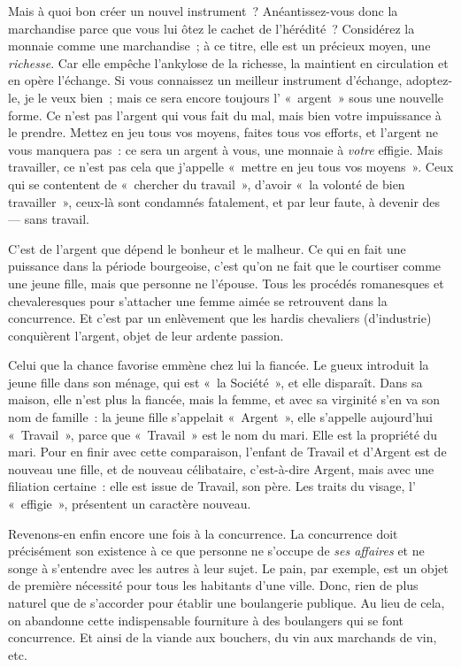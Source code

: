 \documentclass[french,twoside]{book} %
\begin{document}
Mais à quoi bon créer un nouvel instrument ? Anéantissez-vous donc la marchandise parce que vous  lui ôtez le cachet de l’hérédité ? Considérez la monnaie comme une marchandise ; à ce titre, elle est un précieux moyen, une \emph{richesse}. Car elle empêche l’ankylose de la richesse, la maintient en circulation et en opère l’échange. Si vous connaissez un meilleur instrument d’échange, adoptez-le, je le veux bien ; mais ce sera encore toujours l’ « argent » sous une nouvelle forme. Ce n’est pas l’argent qui vous fait du mal, mais bien votre impuissance à le prendre. Mettez en jeu tous vos moyens, faites tous vos efforts, et l’argent ne vous manquera pas : ce sera un argent à vous, une monnaie à \emph{votre} effigie. Mais travailler, ce n’est pas cela que j’appelle « mettre en jeu tous vos moyens ». Ceux qui se contentent de « chercher du travail », d’avoir « la volonté de bien travailler », ceux-là sont condamnés fatalement, et par leur faute, à devenir des — sans travail.\par
C’est de l’argent que dépend le bonheur et le malheur. Ce qui en fait une puissance dans la période bourgeoise, c’est qu’on ne fait que le courtiser comme une jeune fille, mais que personne ne l’épouse. Tous les procédés romanesques et chevaleresques pour s’attacher une femme aimée se retrouvent dans la concurrence. Et c’est par un enlèvement que les hardis chevaliers (d’industrie) conquièrent l’argent, objet de leur ardente passion.\par
Celui que la chance favorise emmène chez lui la fiancée. Le gueux introduit la jeune fille dans son ménage, qui est « la Société », et elle disparaît. Dans sa maison, elle n’est plus la fiancée, mais la femme, et avec sa virginité s’en va son nom de famille : la jeune fille s’appelait « Argent », elle s’appelle aujourd’hui « Travail », parce que « Travail » est le nom du mari. Elle est la propriété du mari. Pour en finir avec cette comparaison, l’enfant de Travail et d’Argent est de nouveau une fille, et de nouveau célibataire, c’est-à-dire Argent, mais avec une filiation certaine : elle est issue de Travail, son père. Les  traits du visage, l’ « effigie », présentent un caractère nouveau.\par
Revenons-en enfin encore une fois à la concurrence. La concurrence doit précisément son existence à ce que personne ne s’occupe de \emph{ses affaires} et ne songe à s’entendre avec les autres à leur sujet. Le pain, par exemple, est un objet de première nécessité pour tous les habitants d’une ville. Donc, rien de plus naturel que de s’accorder pour établir une boulangerie publique. Au lieu de cela, on abandonne cette indispensable fourniture à des boulangers qui se font concurrence. Et ainsi de la viande aux bouchers, du vin aux marchands de vin, etc.\par
\end{document}
